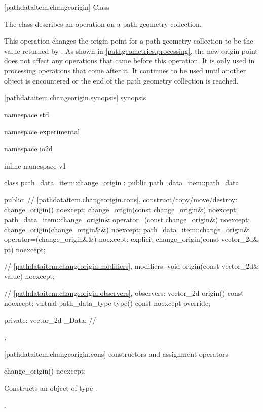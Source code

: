  [pathdataitem.changeorigin] {Class }

\pnum
{}
The class  describes an operation on a path geometry collection.

\pnum
This operation changes the origin point for a path geometry collection to be the value returned by . As shown in \ref{pathgeometries.processing}, the new origin point does not affect any operations that came before this operation. It is only used in processing operations that come after it. It continues to be used until another  object is encountered or the end of the path geometry collection is reached.

 [pathdataitem.changeorigin.synopsis] { synopsis}

\begin{codeblock}
namespace std { namespace experimental { namespace io2d { inline namespace v1 {
  class path_data_item::change_origin : public path_data_item::path_data {
  public:
    // \ref{pathdataitem.changeorigin.cons}, construct/copy/move/destroy:
    change_origin() noexcept;
    change_origin(const change_origin&) noexcept;
    path_data_item::change_origin& operator=(const change_origin&) noexcept;
    change_origin(change_origin&&) noexcept;
    path_data_item::change_origin& operator=(change_origin&&) noexcept;
    explicit change_origin(const vector_2d& pt) noexcept;

    // \ref{pathdataitem.changeorigin.modifiers}, modifiers:
    void origin(const vector_2d& value) noexcept;

    // \ref{pathdataitem.changeorigin.observers}, observers:
    vector_2d origin() const noexcept;
    virtual path_data_type type() const noexcept override;
    
  private:
    vector_2d _Data; // \expos
  };
} } } }
\end{codeblock}

 [pathdataitem.changeorigin.cons] { constructors and assignment operators}

\begin{itemdecl}
    change_origin() noexcept;
\end{itemdecl}
\begin{itemdescr}
	\pnum
	\effects
	Constructs an object of type .
	
	\pnum
	\postconditions
	.
\end{itemdescr}

